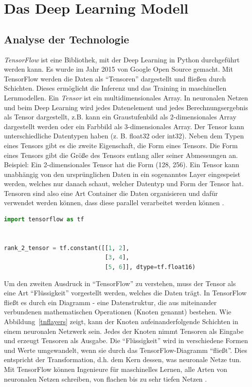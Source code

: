 \chapter{Das Deep Learning Modell}\label{ch7}
\section{Analyse der Technologie}
\textit{TensorFlow} ist eine Bibliothek, mit der Deep Learning in Python durchgeführt werden kann. Es wurde im Jahr 2015 von Google Open Source gemacht. Mit TensorFlow werden die Daten als \enquote{Tensoren} dargestellt und fließen durch Schichten. Dieses ermöglicht die Inferenz und das Training in maschinellen Lernmodellen. Ein \textit{Tensor} ist ein multidimensionales Array. In neuronalen Netzen und beim Deep Learning wird jedes Datenelement und jedes Berechnungsergebnis als Tensor dargestellt, z.B. kann ein Graustufenbild als 2-dimensionales Array dargestellt werden oder ein Farbbild als 3-dimensionales Array. Der Tensor kann unterschiedliche Datentypen haben (z. B. float32 oder int32). Neben dem Typen eines Tensors gibt es die zweite Eigenschaft, die Form eines Tensors. Die Form eines Tensors gibt die Größe des Tensors entlang aller seiner Abmessungen an. Beispiel: Ein 2-dimensionales Tensor hat die Form (128, 256). Ein Tensor kann unabhängig von den ursprünglichen Daten in ein sogenanntes Layer eingespeist werden, welches nur danach schaut, welcher Datentyp und Form der Tensor hat. Tensoren sind also eine Art Container die Daten organisieren und dafür verwendet werden können, dass diese parallel verarbeitet werden können \cite[27]{cai2020deep}.


\begin{lstlisting}[language=Python,caption=Beispiel eines Tensors in TensorFlow, label={Label4}]
import tensorflow as tf


rank_2_tensor = tf.constant([[1, 2],
                             [3, 4],
                             [5, 6]], dtype=tf.float16)
\end{lstlisting}

Um den zweiten Ausdruck in \enquote{TensorFlow} zu verstehen, muss der Tensor als eine Art \enquote{Flüssigkeit} vorgestellt werden, welches die Daten trägt. In TensorFlow fließt es durch ein Diagramm - eine Datenstruktur, die aus miteinander verbundenen mathematischen Operationen (Knoten genannt) bestehen. Wie Abbildung~\ref{tnflayers} zeigt, kann der Knoten aufeinanderfolgende Schichten in einem neuronalen Netzwerk sein. Jedes der Knoten nimmt Tensoren als Eingabe und erzeugt Tensoren als Ausgabe. Die \enquote{Flüssigkeit} wird in verschiedene Formen und Werte umgewandelt, wenn sie durch das TensorFlow-Diagramm \enquote{fließt}. Dies entspricht der Transformation, d.h. dem Kern dessen, was neuronale Netze tun. Mit TensorFlow können Ingenieure für maschinelles Lernen, alle Arten von neuronalen Netzen schreiben, von flachen bis zu sehr tiefen Netzen \cite[27-28]{cai2020deep}.

